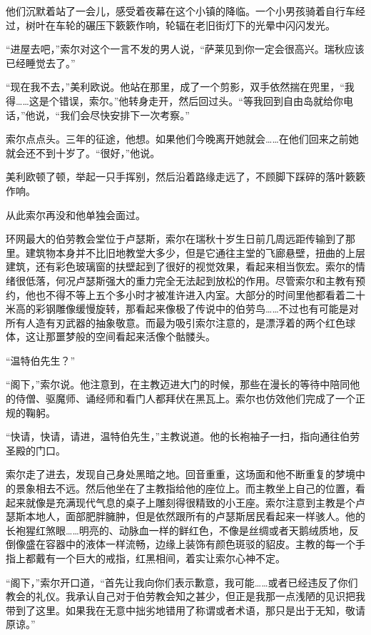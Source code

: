 \documentclass[AutoFakeBold=true]{book}
\begin{document}
他们沉默着站了一会儿，感受着夜幕在这个小镇的降临。一个小男孩骑着自行车经过，树叶在车轮的碾压下簌簌作响，轮辐在老旧街灯下的光晕中闪闪发光。

``进屋去吧，''索尔对这个一言不发的男人说，``萨莱见到你一定会很高兴。瑞秋应该已经睡觉去了。''

``现在我不去，''美利欧说。他站在那里，成了一个剪影，双手依然揣在兜里，``我得……这是个错误，索尔。''他转身走开，然后回过头。``等我回到自由岛就给你电话，''他说，``我们会尽快安排下一次考察。''

索尔点点头。{\kaishu 三年的征途}，他想。{\kaishu 如果他们今晚离开她就会……在他们回来之前她就会还不到十岁了}。``很好，''他说。

美利欧顿了顿，举起一只手挥别，然后沿着路缘走远了，不顾脚下踩碎的落叶簌簌作响。

从此索尔再没和他单独会面过。

\vspace*{1em}

环网最大的伯劳教会堂位于卢瑟斯，索尔在瑞秋十岁生日前几周远距传输到了那里。建筑物本身并不比旧地教堂大多少，但是它通往主堂的飞廊悬壁，扭曲的上层建筑，还有彩色玻璃窗的扶壁起到了很好的视觉效果，看起来相当恢宏。索尔的情绪很低落，何况卢瑟斯强大的重力完全无法起到放松的作用。尽管索尔和主教有预约，他也不得不等上五个多小时才被准许进入内室。大部分的时间里他都看着二十米高的彩钢雕像缓慢旋转，那看起来像极了传说中的伯劳鸟……不过也有可能是对所有人造有刃武器的抽象敬意。而最为吸引索尔注意的，是漂浮着的两个红色球体，这让那噩梦般的空间看起来活像个骷髅头。

``温特伯先生？''

``阁下，''索尔说。他注意到，在主教迈进大门的时候，那些在漫长的等待中陪同他的侍僧、驱魔师、诵经师和看门人都拜伏在黑瓦上。索尔也仿效他们完成了一个正规的鞠躬。

``快请，快请，请进，温特伯先生，''主教说道。他的长袍袖子一扫，指向通往伯劳圣殿的门口。

索尔走了进去，发现自己身处黑暗之地。回音重重，这场面和他不断重复的梦境中的景象相去不远。然后他坐在了主教指给他的座位上。而主教坐上自己的位置，看起来就像是充满现代气息的桌子上雕刻得很精致的小王座。索尔注意到主教是个卢瑟斯本地人，面部肥胖臃肿，但是依然跟所有的卢瑟斯居民看起来一样骇人。他的长袍猩红煞眼……明亮的、动脉血一样的鲜红色，不像是丝绸或者天鹅绒质地，反倒像盛在容器中的液体一样流畅，边缘上装饰有颜色斑驳的貂皮。主教的每一个手指上都戴有一个巨大的戒指，红黑相间，着实让索尔心神不定。

``阁下，''索尔开口道，``首先让我向你们表示歉意，我可能……或者已经违反了你们教会的礼仪。我承认自己对于伯劳教会知之甚少，但正是我那一点浅陋的见识把我带到了这里。如果我在无意中拙劣地错用了称谓或者术语，那只是出于无知，敬请原谅。''
\end{document}
